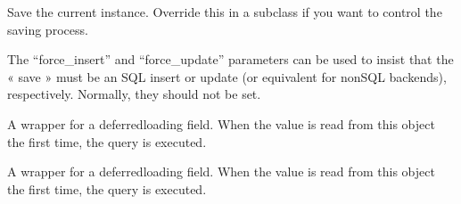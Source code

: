 \documentclass[letterpaper,10pt,french]{sphinxmanual}
\begin{document}
\begin{fulllineitems}
\begin{fulllineitems}
\end{fulllineitems}


\begin{fulllineitems}
\label{\detokenize{main/model:main.models.Tuteur.save}}
\pysigstartsignatures
{}
\pysigstopsignatures
\sphinxAtStartPar
Save the current instance. Override this in a subclass if you want to
control the saving process.

\sphinxAtStartPar
The “force\_insert” and “force\_update” parameters can be used to insist
that the « save » must be an SQL insert or update (or equivalent for
non\sphinxhyphen{}SQL backends), respectively. Normally, they should not be set.

\end{fulllineitems}


\begin{fulllineitems}
\label{\detokenize{main/model:main.models.Tuteur.sexe}}
\pysigstartsignatures
{}
\pysigstopsignatures
\sphinxAtStartPar
A wrapper for a deferred\sphinxhyphen{}loading field. When the value is read from this
object the first time, the query is executed.

\end{fulllineitems}


\begin{fulllineitems}
\label{\detokenize{main/model:main.models.Tuteur.type}}
\pysigstartsignatures
{}
\pysigstopsignatures
\sphinxAtStartPar
A wrapper for a deferred\sphinxhyphen{}loading field. When the value is read from this
object the first time, the query is executed.

\end{fulllineitems}


\end{fulllineitems}

\end{document}

